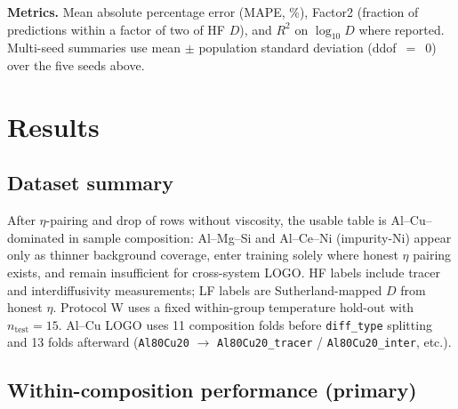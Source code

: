 \documentclass[review,12pt]{elsarticle}
\begin{document}
\textbf{Metrics.} Mean absolute percentage error (MAPE, \%), Factor2 (fraction of predictions within a factor of two of HF $D$), and $R^{2}$ on $\log_{10} D$ where reported. Multi-seed summaries use mean $\pm$ population standard deviation (ddof~$=$~0) over the five seeds above.

\section{Results}
\label{sec:results}

\subsection{Dataset summary}
\label{sec:dataset}

After $\eta$-pairing and drop of rows without viscosity, the usable table is Al--Cu--dominated in sample composition: Al--Mg--Si and Al--Ce--Ni (impurity-Ni) appear only as thinner background coverage, enter training solely where honest $\eta$ pairing exists, and remain insufficient for cross-system LOGO. HF labels include tracer and interdiffusivity measurements; LF labels are Sutherland-mapped $D$ from honest $\eta$. Protocol W uses a fixed within-group temperature hold-out with $n_{\mathrm{test}}=15$. Al--Cu LOGO uses 11 composition folds before \texttt{diff\_type} splitting and 13 folds afterward (\texttt{Al80Cu20} $\to$ \texttt{Al80Cu20\_tracer} / \texttt{Al80Cu20\_inter}, etc.).


\subsection{Within-composition performance (primary)}
\label{sec:protocolW}
\end{document}
